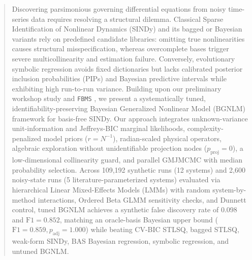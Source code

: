 \documentclass{article}
\begin{document}

\printAffiliationsAndNotice{}

\begin{abstract}
Discovering parsimonious governing differential equations from noisy time-series data requires resolving a structural dilemma. Classical Sparse Identification of Nonlinear Dynamics (SINDy) and its bagged or Bayesian variants rely on predefined candidate libraries: omitting true nonlinearities causes structural misspecification, whereas overcomplete bases trigger severe multicollinearity and estimation failure. Conversely, evolutionary symbolic regression avoids fixed dictionaries but lacks calibrated posterior inclusion probabilities (PIPs) and Bayesian predictive intervals while exhibiting high run-to-run variance. Building upon our preliminary workshop study \citep{hubin2025bgnlm} and \texttt{FBMS} \citep{lachmann2025fbms}, we present a systematically tuned, identifiability-preserving Bayesian Generalized Nonlinear Model (BGNLM) framework for basis-free SINDy. Our approach integrates unknown-variance unit-information and Jeffreys-BIC marginal likelihoods, complexity-penalized model priors ($r = N^{-1}$), radian-scaled physical operators, algebraic exploration without unidentifiable projection nodes ($p_{\text{proj}}=0$), a low-dimensional collinearity guard, and parallel GMJMCMC with median probability selection. Across 109,192 synthetic runs (12 systems) and 2,600 noisy-state runs (5 literature-parameterized systems) evaluated via hierarchical Linear Mixed-Effects Models (LMMs) with random system-by-method interactions, Ordered Beta GLMM sensitivity checks, and Dunnett control, tuned BGNLM achieves a synthetic false discovery rate of $0.098$ and $\text{F1}=0.852$, matching an oracle-basis Bayesian upper bound ($\text{F1}=0.859, p_{\text{adj}}=1.000$) while beating CV-BIC STLSQ, bagged STLSQ, weak-form SINDy, BAS Bayesian regression, symbolic regression, and untuned BGNLM.
\end{abstract}
\end{document}
